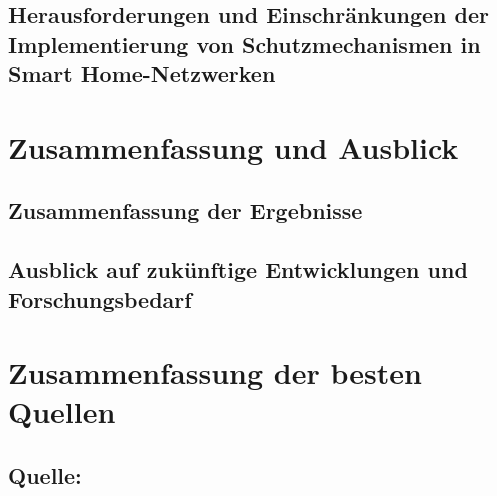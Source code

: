 \subsection{Herausforderungen und Einschränkungen der Implementierung von Schutzmechanismen in Smart Home-Netzwerken}

\newpage
\section{Zusammenfassung und Ausblick}

\subsection{Zusammenfassung der Ergebnisse}
\subsection{Ausblick auf zukünftige Entwicklungen und Forschungsbedarf}

\newpage

\section{Zusammenfassung der besten Quellen}
\subsection{Quelle: \cite{10.1145/2732209.2732216}} 
    
\newpage

    \nocite{*}
    



